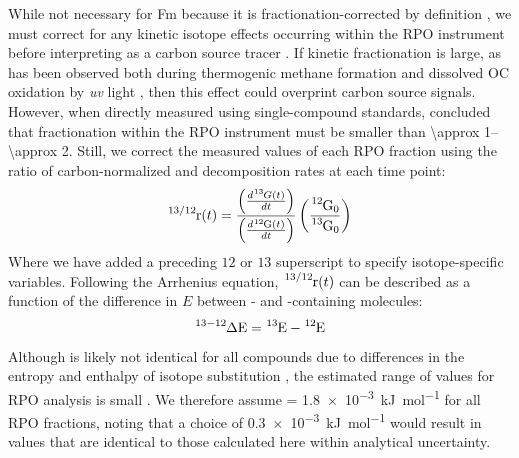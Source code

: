 While not necessary for Fm because it is fractionation-corrected by definition \citep{Stuiver:1977uh,dosSantos:2007ca}, we must correct for any kinetic isotope effects occurring within the RPO instrument before interpreting  as a carbon source tracer \citep{Hemingway:2016rc}. If kinetic fractionation is large, as has been observed both during thermogenic methane formation \citep{Tang:2000ua,Cramer:2004tg} and dissolved OC oxidation by \textit{uv} light \citep{Oba:2008fv}, then this effect could overprint carbon source  signals. However, when directly measured using single-compound standards, \citet{Hemingway:2016rc} concluded that  fractionation within the RPO instrument must be smaller than \SIrange{\approx 1}{\approx 2}{\permil}. Still, we correct the measured  values of each RPO fraction using the ratio of carbon-normalized  and  decomposition rates at each time point:
%
\begin{equation}\label{Ch3Eq:24}
	\ce{^{13/12}r}(t) = \frac{\left( \frac{d \ce{^{13}}G(t)}{dt} \right)}{\left( \frac{d \ce{^{12}G}(t)}{dt} \right)} \left( \frac{\ce{^{12}G}_0}{\ce{^{13}G}_0} \right)
\end{equation}
%
Where we have added a preceding $12$ or $13$ superscript to specify isotope-specific variables. Following the Arrhenius equation, $\ce{^{13/12}r}(t)$ can be described as a function of the difference in $E$ between - and -containing molecules:
%
\begin{equation}\label{Ch3Eq:25}
	\ce{^{13-12}\Delta E} = \ce{^{13}E} - \ce{^{12}E}
\end{equation}
%
Although  is likely not identical for all compounds due to differences in the entropy and enthalpy of isotope substitution \citep{Tang:2000ua}, the estimated range of values for RPO analysis is small \citep[\SIrange{0.3e-3}{1.8e-3}{kJ.mol^{-1}};][]{Hemingway:2016rc}. We therefore assume  = \SI{1.8e-3}{kJ.mol^{-1}} for all RPO fractions, noting that a choice of \SI{0.3e-3}{kJ.mol^{-1}} would result in  values that are identical to those calculated here within analytical uncertainty.

